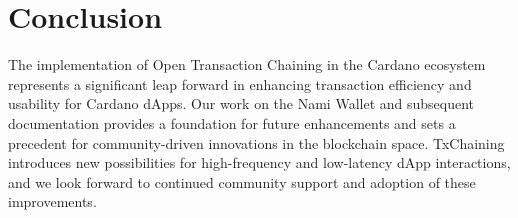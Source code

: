 \documentclass[11pt]{article}
\begin{document}
\section{Conclusion}
The implementation of Open Transaction Chaining in the Cardano ecosystem represents a significant leap forward in enhancing transaction efficiency and usability for Cardano dApps. Our work on the Nami Wallet and subsequent documentation provides a foundation for future enhancements and sets a precedent for community-driven innovations in the blockchain space. TxChaining introduces new possibilities for high-frequency and low-latency dApp interactions, and we look forward to continued community support and adoption of these improvements.
\end{document}
